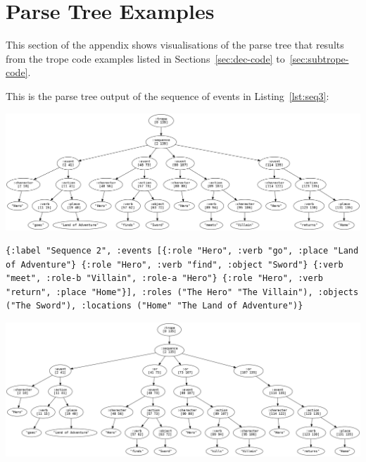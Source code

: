 \documentclass[11pt]{report}
\begin{document}
\section{Parse Tree Examples}
\label{appendix:parse-tree}


This section of the appendix shows visualisations of the parse tree that results from the trope
code examples listed in Sections~\ref{sec:dec-code} to~\ref{sec:subtrope-code}.

This is the parse tree output of the sequence of events in Listing~\ref{lst:seq3}:

\vspace{7mm}
\centerline{\includegraphics[width=\textwidth]{seq2-tree.png}}
\vspace{7mm}

\begin{lstlisting}[showstringspaces=false]
{:label "Sequence 2", :events [{:role "Hero", :verb "go", :place "Land of Adventure"} {:role "Hero", :verb "find", :object "Sword"} {:verb "meet", :role-b "Villain", :role-a "Hero"} {:role "Hero", :verb "return", :place "Home"}], :roles ("The Hero" "The Villain"), :objects ("The Sword"), :locations ("Home" "The Land of Adventure")}
\end{lstlisting}

\vspace{7mm}
\centerline{\includegraphics[width=\textwidth]{branch2-tree.png}}
\vspace{7mm}
\end{document}
